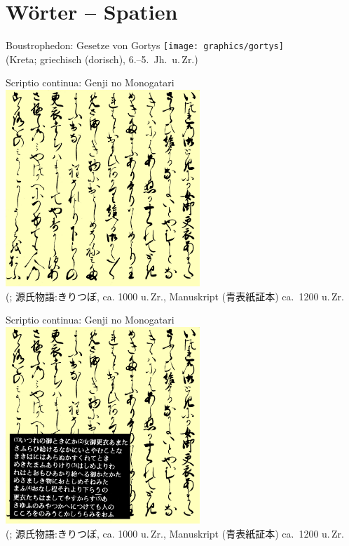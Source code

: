 \section{Wörter -- Spatien}

\begin{frame}
  {Boustrophedon: Gesetze von Gortys}
  \pause
  \centering
  \texttt{[image: graphics/gortys]}\\
  {\tiny (Kreta; griechisch (dorisch), 6.--5.\ Jh.\ u.\,Zr.)}
\end{frame}

\begin{frame}
  {Scriptio continua: Genji no Monogatari}
  \pause
  \centering
  \includegraphics[width=0.55\textwidth]{graphics/genji1}\\
  {\tiny (\citealt{Rickmeyer1991}; 源氏物語:きりつぼ, ca. 1000 u.\,Zr., Manuskript (青表紙証本) ca.\ 1200 u.\,Zr.}
\end{frame}

\begin{frame}
  {Scriptio continua: Genji no Monogatari}
  \centering
  \includegraphics[width=0.55\textwidth]{graphics/genji3}\\
  {\tiny (\citealt{Rickmeyer1991}; 源氏物語:きりつぼ, ca. 1000 u.\,Zr., Manuskript (青表紙証本) ca.\ 1200 u.\,Zr.}
\end{frame}

